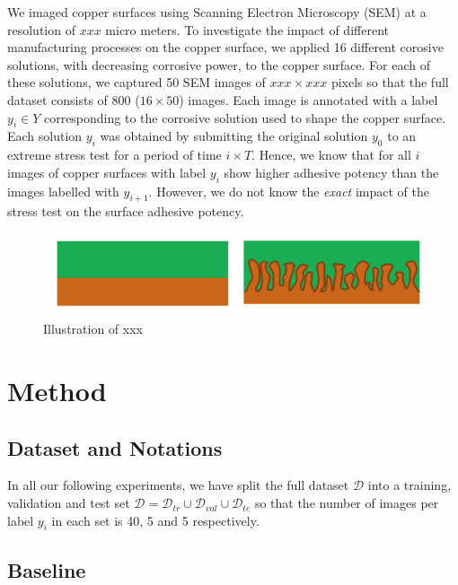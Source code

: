 \documentclass[10pt,twocolumn,letterpaper]{article}
\begin{document}
We imaged copper surfaces using Scanning Electron Microscopy (SEM) at a resolution of $xxx$ micro meters.
To investigate the impact of different manufacturing processes on the copper surface, 
we applied 16 different corosive solutions, with decreasing corrosive power, to the copper surface.
For each of these solutions, we captured 50 SEM images of $xxx \times xxx$ pixels so that the full dataset
consists of $800$ ($16 \times 50$) images.
Each image is annotated with a label $y_i \in Y$ corresponding to the corrosive solution used to shape the copper surface.
Each solution $y_i$ was obtained by submitting the original solution $y_0$ to an extreme stress test for a period of time $i \times T$.
Hence, we know that for all $i$ images of copper surfaces with label $y_i$ show higher adhesive potency than the images labelled with $y_{i+1}$.
However, we do not know the \textit{exact} impact of the stress test on the surface adhesive potency.

\begin{figure}[h]
	\centering
	\includegraphics[width=0.9\linewidth]{"./figures/Figure2"}
	\caption{
		Illustration of xxx
	}
\end{figure}

\section{Method}

\subsection{Dataset and Notations}


In all our following experiments, we have split the full dataset $\mathcal{D}$ into a training, validation and test set $\mathcal{D}=\mathcal{D}_{tr} \cup \mathcal{D}_{val} \cup \mathcal{D}_{te}$ so that the number of images per label $y_i$ in each set is 40, 5 and 5 respectively.

\subsection{Baseline}
\end{document}

